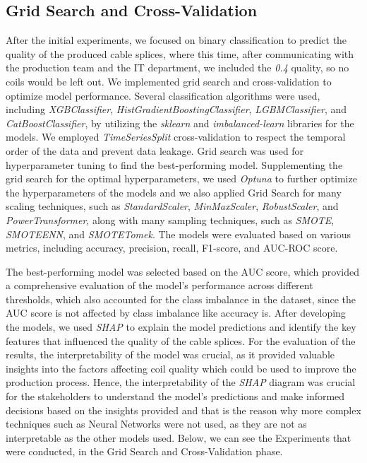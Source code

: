 \subsection{Grid Search and Cross-Validation}

After the initial experiments, we focused on binary classification to predict
the quality of the produced cable splices, where this time, after communicating
with the production team and the IT department, we included the \emph{0.4}
quality, so no coils would be left out. We implemented grid search and
cross-validation to optimize model performance. Several classification
algorithms were used, including \emph{XGBClassifier},
\emph{HistGradientBoostingClassifier}, \emph{LGBMClassifier}, and
\emph{CatBoostClassifier}, by utilizing the \emph{sklearn} and
\emph{imbalanced-learn} libraries for the models. We employed
\emph{TimeSeriesSplit} cross-validation to respect the temporal order of the
data and prevent data leakage. Grid search was used for hyperparameter tuning
to find the best-performing model. Supplementing the grid search for the
optimal hyperparameters, we used \emph{Optuna} to further optimize the
hyperparameters of the models and we also applied Grid Search for many scaling
techniques, such as \emph{StandardScaler}, \emph{MinMaxScaler},
\emph{RobustScaler}, and \emph{PowerTransformer}, along with many sampling
techniques, such as \emph{SMOTE}, \emph{SMOTEENN}, and \emph{SMOTETomek}. The
models were evaluated based on various metrics, including accuracy, precision,
recall, F1-score, and AUC-ROC score.

The best-performing model was selected based on the AUC score, which provided a
comprehensive evaluation of the model's performance across different
thresholds, which also accounted for the class imbalance in the dataset, since
the AUC score is not affected by class imbalance like accuracy is. After
developing the models, we used \emph{SHAP} to explain the model predictions and
identify the key features that influenced the quality of the cable splices. For
the evaluation of the results, the interpretability of the model was crucial,
as it provided valuable insights into the factors affecting coil quality which
could be used to improve the production process. Hence, the interpretability of
the \emph{SHAP} diagram was crucial for the stakeholders to understand the
model's predictions and make informed decisions based on the insights provided
and that is the reason why more complex techniques such as Neural Networks were
not used, as they are not as interpretable as the other models used. Below, we
can see the Experiments that were conducted, in the Grid Search and
Cross-Validation phase.

